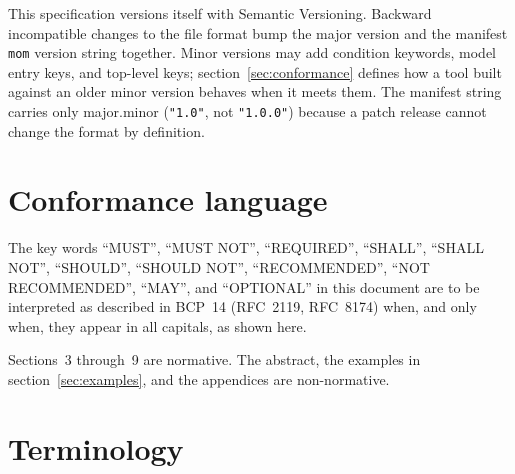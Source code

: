 \documentclass[11pt]{article}
\newcommand{\key}[1]{\texttt{#1}}
\begin{document}
This specification versions itself with Semantic Versioning. Backward
incompatible changes to the file format bump the major version and the
manifest \key{mom} version string together. Minor versions may add condition
keywords, model entry keys, and top-level keys; section~\ref{sec:conformance}
defines how a tool built against an older minor version behaves when it meets
them. The manifest string carries only major.minor (\key{"1.0"}, not
\key{"1.0.0"}) because a patch release cannot change the format by
definition.

\section{Conformance language}

The key words ``MUST'', ``MUST NOT'', ``REQUIRED'', ``SHALL'', ``SHALL NOT'',
``SHOULD'', ``SHOULD NOT'', ``RECOMMENDED'', ``NOT RECOMMENDED'', ``MAY'', and
``OPTIONAL'' in this document are to be interpreted as described in BCP~14
(RFC~2119, RFC~8174) when, and only when, they appear in all capitals, as
shown here.

Sections~3 through~9 are normative. The abstract, the examples in
section~\ref{sec:examples}, and the appendices are non-normative.

\section{Terminology}
\end{document}
